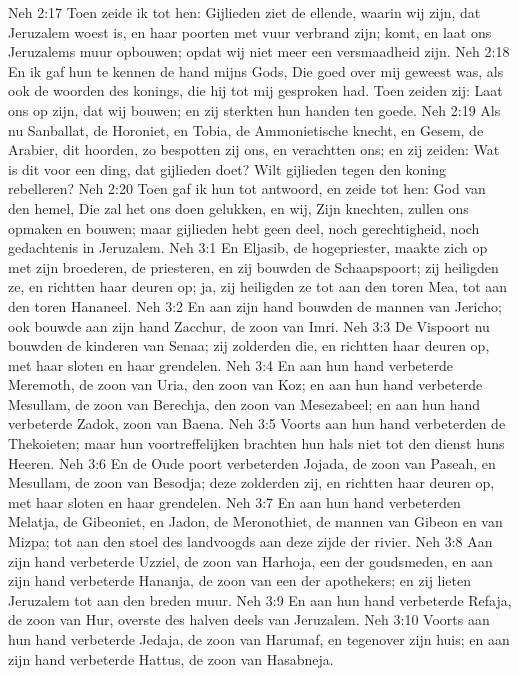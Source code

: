 Neh 2:17  Toen zeide ik tot hen: Gijlieden ziet de ellende, waarin wij zijn, dat Jeruzalem woest is, en haar poorten met vuur verbrand zijn; komt, en laat ons Jeruzalems muur opbouwen; opdat wij niet meer een versmaadheid zijn.
Neh 2:18  En ik gaf hun te kennen de hand mijns Gods, Die goed over mij geweest was, als ook de woorden des konings, die hij tot mij gesproken had. Toen zeiden zij: Laat ons op zijn, dat wij bouwen; en zij sterkten hun handen ten goede.
Neh 2:19  Als nu Sanballat, de Horoniet, en Tobia, de Ammonietische knecht, en Gesem, de Arabier, dit hoorden, zo bespotten zij ons, en verachtten ons; en zij zeiden: Wat is dit voor een ding, dat gijlieden doet? Wilt gijlieden tegen den koning rebelleren?
Neh 2:20  Toen gaf ik hun tot antwoord, en zeide tot hen: God van den hemel, Die zal het ons doen gelukken, en wij, Zijn knechten, zullen ons opmaken en bouwen; maar gijlieden hebt geen deel, noch gerechtigheid, noch gedachtenis in Jeruzalem.
Neh 3:1  En Eljasib, de hogepriester, maakte zich op met zijn broederen, de priesteren, en zij bouwden de Schaapspoort; zij heiligden ze, en richtten haar deuren op; ja, zij heiligden ze tot aan den toren Mea, tot aan den toren Hananeel.
Neh 3:2  En aan zijn hand bouwden de mannen van Jericho; ook bouwde aan zijn hand Zacchur, de zoon van Imri.
Neh 3:3  De Vispoort nu bouwden de kinderen van Senaa; zij zolderden die, en richtten haar deuren op, met haar sloten en haar grendelen.
Neh 3:4  En aan hun hand verbeterde Meremoth, de zoon van Uria, den zoon van Koz; en aan hun hand verbeterde Mesullam, de zoon van Berechja, den zoon van Mesezabeel; en aan hun hand verbeterde Zadok, zoon van Baena.
Neh 3:5  Voorts aan hun hand verbeterden de Thekoieten; maar hun voortreffelijken brachten hun hals niet tot den dienst huns Heeren.
Neh 3:6  En de Oude poort verbeterden Jojada, de zoon van Paseah, en Mesullam, de zoon van Besodja; deze zolderden zij, en richtten haar deuren op, met haar sloten en haar grendelen.
Neh 3:7  En aan hun hand verbeterden Melatja, de Gibeoniet, en Jadon, de Meronothiet, de mannen van Gibeon en van Mizpa; tot aan den stoel des landvoogds aan deze zijde der rivier.
Neh 3:8  Aan zijn hand verbeterde Uzziel, de zoon van Harhoja, een der goudsmeden, en aan zijn hand verbeterde Hananja, de zoon van een der apothekers; en zij lieten Jeruzalem tot aan den breden muur.
Neh 3:9  En aan hun hand verbeterde Refaja, de zoon van Hur, overste des halven deels van Jeruzalem.
Neh 3:10  Voorts aan hun hand verbeterde Jedaja, de zoon van Harumaf, en tegenover zijn huis; en aan zijn hand verbeterde Hattus, de zoon van Hasabneja.
